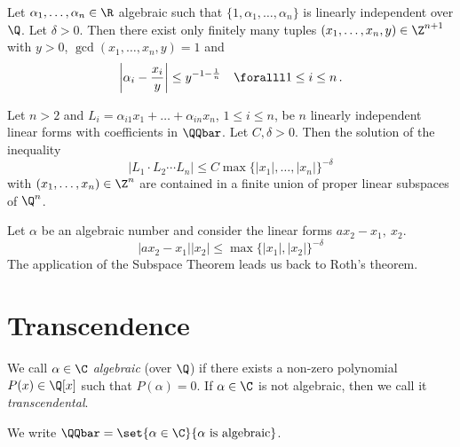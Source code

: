 \begin{thm*}
	Let \( \alpha_1, \dotsc, \alpha_n \in \R \) algebraic such that \( \{1, \alpha_1, \dotsc, \alpha_n\} \) is linearly independent over \( \Q \).
	Let \( \delta > 0 \).
	Then there exist only finitely many tuples \( (x_1, \dotsc, x_n, y) \in \Z^{n+1} \) with \( y>0 \), \( \gcd(x_1, \dotsc, x_n, y)=1 \) and
	\[ \left| \alpha_i - \frac{x_i}{y} \right| \leq y^{-1 - \frac{1}{n}} \quad \foralll 1 \leq i \leq n \,. \]
\end{thm*}

\begin{thm*}
	Let \( n>2 \) and \( L_i = \alpha_{i1} x_1 + \dots + \alpha_{in}x_n \), \( 1 \leq i \leq n \), be \( n \) linearly independent linear forms with coefficients in \( \QQbar \).
	Let \( C, \delta > 0 \).
	Then the solution of the inequality
	\[ \left| L_1 \cdot L_2 \dotsm L_n \right| \leq C \max \{|x_1|, \dotsc, |x_n|\}^{-\delta} \]
	with \( (x_1, \dotsc, x_n) \in \Z^n \) are contained in a finite union of proper linear subspaces of \( \Q^n \).
\end{thm*}

\begin{exmp*}
	Let \( \alpha \) be an algebraic number and consider the linear forms \( ax_2 - x_1,\ x_2 \).
	\[ |ax_2 - x_1| |x_2| \leq \max \{|x_1|, |x_2|\}^{-\delta} \]
	The application of the Subspace Theorem leads us back to Roth's theorem.
\end{exmp*}


\section{Transcendence}\label{sec:4.2}

\begin{defn*}
	We call \( \alpha \in \C \) \emph{algebraic} (over \( \Q \)) if there exists a non-zero polynomial \( P(x) \in \Q[x] \) such that \( P(\alpha) = 0 \).
	If \( \alpha \in \C \) is not algebraic, then we call it \emph{transcendental}.
\end{defn*}

\begin{notat*}
	We write \( \QQbar = \set{\alpha \in \C}{\alpha \ \text{is algebraic}} \).
\end{notat*}


